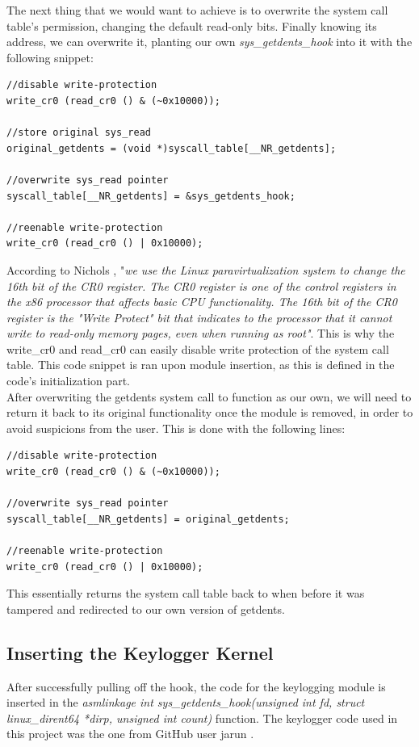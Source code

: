 \documentclass[conference]{IEEEtran}
\newcommand\tab[1][0.5cm]{\hspace*{#1}}
\begin{document}
	The next thing that we would want to achieve is to overwrite the system call table's permission, changing the default read-only bits. Finally knowing its address, we can overwrite it, planting our own \emph{sys\_getdents\_hook} into it with the following snippet:
	\begin{lstlisting}
//disable write-protection
write_cr0 (read_cr0 () & (~0x10000)); 

//store original sys_read
original_getdents = (void *)syscall_table[__NR_getdents];  

//overwrite sys_read pointer
syscall_table[__NR_getdents] = &sys_getdents_hook; 

//reenable write-protection
write_cr0 (read_cr0 () | 0x10000);    
	\end{lstlisting}
	According to Nichols \cite{3}, "\emph{we use the Linux paravirtualization system to change the 16th bit of the CR0 register. The CR0 register is one of the control registers in the x86 processor that affects basic CPU functionality. The 16th bit of the CR0 register is the "Write Protect" bit that indicates to the processor that it cannot write to read-only memory pages, even when running as root"}. This is why the write\_cr0 and read\_cr0 can easily disable write protection of the system call table. This code snippet is ran upon module insertion, as this is defined in the code's initialization part. \\
	
	\tab After overwriting the getdents system call to function as our own, we will need to return it back to its original functionality once the module is removed, in order to avoid suspicions from the user. This is done with the following lines:
	
	\begin{lstlisting} 
//disable write-protection
write_cr0 (read_cr0 () & (~0x10000)); 

//overwrite sys_read pointer
syscall_table[__NR_getdents] = original_getdents;

//reenable write-protection
write_cr0 (read_cr0 () | 0x10000);  
	\end{lstlisting}
	\tab This essentially returns the system call table back to when before it was tampered and redirected to our own version of getdents.
	
	\subsection{Inserting the Keylogger Kernel}
	After successfully pulling off the hook, the code for the keylogging module is inserted in the \emph{asmlinkage int sys\_getdents\_hook(unsigned int fd, struct linux\_dirent64 *dirp, unsigned int count)} function. The keylogger code used in this project was the one from GitHub user jarun \cite{9}. 
	
\end{document}
